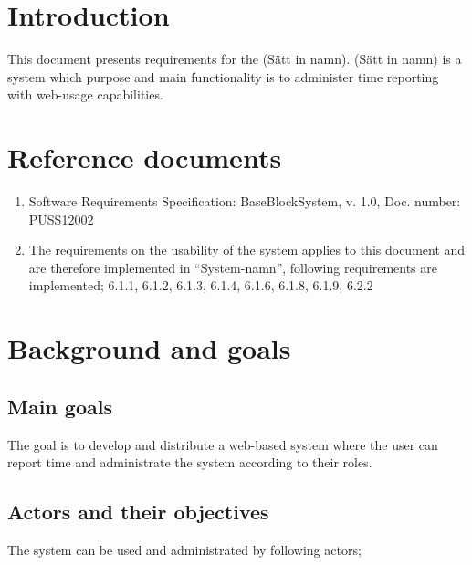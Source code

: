 \documentclass{article}
\date {#1}
\title {
    \documentNumber {01}    
    
    \documentVersion {0.1}
    
    \documentTitle {Template}
    \documentGroup {2}
    
    \documentResponsible {Project management Group}
    \documentAuthors {Project management group}
    
    \documentDate {2021-01-25}
}
\begin{document}
\maketitle
\thispagestyle{empty}

\newpage

\tableofcontents

\newpage



\section{Introduction}

This document presents requirements for the (Sätt in namn). (Sätt in namn) is a system which purpose and main functionality is to administer time reporting with web-usage capabilities. 


\section{Reference documents}

\begin{enumerate}
  \item Software Requirements Specification: BaseBlockSystem, v. 1.0, Doc. number: PUSS12002
  \item The requirements on the usability of the system applies to this document and are therefore implemented in “System-namn”, following requirements are implemented; 6.1.1, 6.1.2, 6.1.3, 6.1.4, 6.1.6, 6.1.8, 6.1.9, 6.2.2
\end{enumerate}

\section{Background and goals}
\subsection{Main goals}

The goal is to develop and distribute a web-based system where the user can report time and administrate the system according to their roles.

\subsection{Actors and their objectives}
The system can be used and administrated by following actors;
\end{document}
